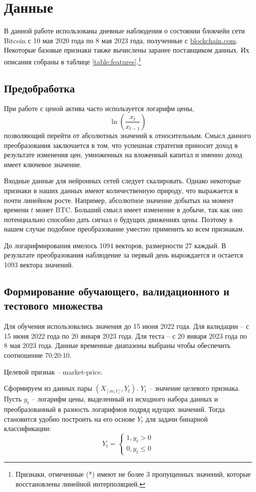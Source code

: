 \documentclass[diploma]{nanolab2015}
\begin{document}
\section{Данные}
В данной работе использованы дневные наблюдения о состоянии блокчейн сети Bitcoin с 10 мая 2020 года по 8 мая 2023 года, полученные с \href{https://www.blockchain.com/explorer/charts}{blockchain.com}. Некоторые базовые признаки также вычислены заранее поставщиком данных. Их описания собраны в таблице \ref{table:features}.\footnote{Признаки, отмеченные (*) имеют не более 3 пропущенных значений, которые восстановлены линейной интерполяцией.}

\subsection{Предобработка}
При работе с ценой актива часто используется логарифм цены,
$$
    \ln\left(\frac{x_{t}}{x_{t-1}}\right)
$$
позволяющий перейти от абсолютных значений к относительным. Смысл данного преобразования заключается в том, что успешная стратегия приносит доход в результате изменения цен, умноженных на вложенный капитал и именно доход имеет ключевое значение.

Входные данные для нейронных сетей следует скалировать. Однако некоторые признаки в наших данных имеют количественную природу, что выражается в почти линейном росте. Например, абсолютное значение добытых на момент времени $t$ монет BTC. Больший смысл имеет изменение в добыче, так как оно потенциально способно дать сигнал о будущих движениях цены. Поэтому в нашем случае подобное преобразование уместно применить ко всем признакам.

До логарифмирования имелось 1094 векторов, размерности 27 каждый. В результате преобразования наблюдение за первый день вырождается и остается 1093 вектора значений.

\subsection{Формирование обучающего, валидационного и тестового множества}
Для обучения использовались значения до 15 июня 2022 года. Для валидации -- с 15 июня 2022 года по 20 января 2023 года. Для теста -- с 20 января 2023 года по 8 мая 2023 года. Данные временные диапазоны выбраны чтобы обеспечить соотношение 70:20:10.

Целевой признак -- market-price.

Сформируем из данных пары $(X_{[m;t]}, Y_{t})$. $Y_t$ -- значение целевого признака. Пусть $y_t$ -- логарифм цены, выделенный из исходного набора данных и преобразованный в разность логарифмов подряд идущих значений. Тогда становится удобно построить на его основе $Y_t$ для задачи бинарной классификации:
$$
    Y_t =
    \begin{cases}
        1, y_t > 0 \\
        0, y_t \le 0
    \end{cases}
$$
\end{document}
